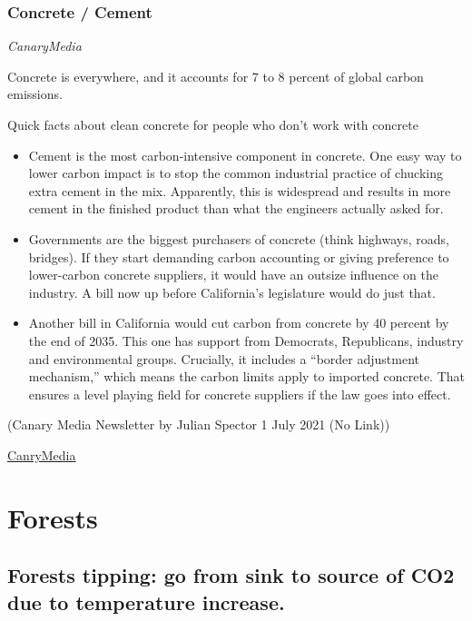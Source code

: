\documentclass[
]{book}
\providecommand{\tightlist}{%
  \setlength{\itemsep}{0pt}\setlength{\parskip}{0pt}}
\begin{document}
\hypertarget{concrete-cement}{%
\subsection{Concrete / Cement}\label{concrete-cement}}

\emph{CanaryMedia}

Concrete is everywhere, and it accounts for 7 to 8 percent of global carbon emissions.

Quick facts about clean concrete for people who don't work with concrete

\begin{itemize}
\tightlist
\item
  Cement is the most carbon-intensive component in concrete. One easy way to lower carbon impact is to stop the common industrial practice of chucking extra cement in the mix. Apparently, this is widespread and results in more cement in the finished product than what the engineers actually asked for.
\item
  Governments are the biggest purchasers of concrete (think highways, roads, bridges). If they start demanding carbon accounting or giving preference to lower-carbon concrete suppliers, it would have an outsize influence on the industry. A bill now up before California's legislature would do just that.
\item
  Another bill in California would cut carbon from concrete by 40 percent by the end of 2035. This one has support from Democrats, Republicans, industry and environmental groups. Crucially, it includes a ``border adjustment mechanism,'' which means the carbon limits apply to imported concrete. That ensures a level playing field for concrete suppliers if the law goes into effect.
\end{itemize}

(Canary Media Newsletter by Julian Spector
1 July 2021 (No Link))

\href{https://www.canarymedia.com/articles/california-considers-ambitious-bills-to-rein-in-carbon-emissions-from-concrete/}{CanryMedia}

\hypertarget{forests}{%
\chapter{Forests}\label{forests}}

\hypertarget{forests-tipping-go-from-sink-to-source-of-co2-due-to-temperature-increase.}{%
\section{Forests tipping: go from sink to source of CO2 due to temperature increase.}\label{forests-tipping-go-from-sink-to-source-of-co2-due-to-temperature-increase.}}
\end{document}
